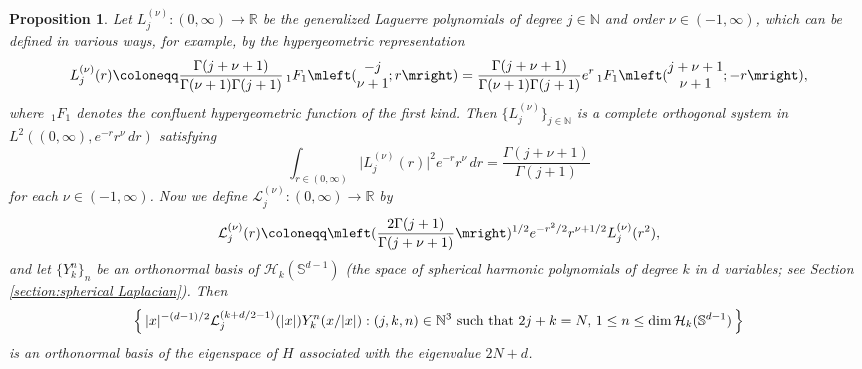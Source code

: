 \documentclass[reqno]{amsart}
\theoremstyle{plain}
\newtheorem{proposition}[theorem]{Proposition}
\numberwithin{equation}{section}
\theoremstyle{remark}
\newcommand{\R}{\mathbb{R}}
\newcommand{\N}{\mathbb{N}}
\renewcommand{\S}{\mathbb{S}}
\newcommand{\intervaloo}[2]{(#1, #2)}
\newcommand{\abs}[1]{\lvert#1\rvert}
\newcommand{\Set}[2]{ \mleft \{ \, #1 : #2 \, \mright\} }
\newcommand{\Hamiltonian}{H}
\newcommand{\hypergeometricpFq}[5]{ \,{}_{#1} F_{#2}\mleft( \begin{matrix}
		#3 \\
		#4
	\end{matrix} ; #5 \mright)  }
\newcommand{\hypergeometricpFqNoArgument}[2]{ \,{}_{#1} F_{#2} }
\newcommand{\LaguerreL}[2]{L_{#1}^{(#2)}}
\newcommand{\LaguerrecalLjnu}[2]{\mathcal{L}_{#1}^{(#2)}}
\newcommand{\Ykn}[2]{Y_{#1}^{#2}}
\newcommand{\HPk}[1]{ \mathcal{H}_{#1} }
\begin{document}
\begin{proposition} \label{prop:Laguerre decomposition}
Let $\LaguerreL{j}{\nu} \colon \intervaloo{0}{\infty} \to \R$ be the generalized Laguerre polynomials of degree $j \in \N$ and order $\nu \in \intervaloo{-1}{\infty}$, which can be defined in various ways, for example, by the hypergeometric representation
\begin{equation} \label{eq:Laguerre polynomials}
	\LaguerreL{j}{\nu}(r) 
	\coloneqq \frac{\Gamma(j+\nu+1)}{\Gamma(\nu+1) \Gamma(j+1)} \hypergeometricpFq{1}{1}{-j}{\nu+1}{r} 
	= \frac{\Gamma(j+\nu+1)}{\Gamma(\nu+1) \Gamma(j+1)} e^{r} \hypergeometricpFq{1}{1}{j+\nu+1}{\nu+1}{-r} ,
\end{equation}
where $\hypergeometricpFqNoArgument{1}{1}$ denotes the confluent hypergeometric function of the first kind.
Then $\{ \LaguerreL{j}{\nu} \}_{j \in \N}$ is a complete orthogonal system in $L^2(\intervaloo{0}{\infty}, e^{-r} r^{\nu} \, dr )$ satisfying
\begin{equation}
 	\int_{r \in \intervaloo{0}{\infty}} \abs{\LaguerreL{j}{\nu}(r)}^2 e^{-r} r^{\nu} \, dr = \frac{\Gamma(j+\nu+1)}{\Gamma(j+1)} 
\end{equation}
for each $\nu \in \intervaloo{-1}{\infty}$.
 	Now we define $\LaguerrecalLjnu{j}{\nu} \colon \intervaloo{0}{\infty} \to \R$ by 
\begin{equation}
\LaguerrecalLjnu{j}{\nu}(r) \coloneqq \mleft( \frac{ 2 \Gamma(j+1) }{ \Gamma(j + \nu + 1) } \mright)^{1/2} e^{-r^2 / 2} r^{\nu + 1/2} \LaguerreL{j}{\nu}(r^2) ,
	\label{eq:Laguerre functions} 
\end{equation}
and let $\{ \Ykn{k}{n} \}_n$ be an orthonormal basis of $\HPk{k}(\S^{d-1})$ (the space of spherical harmonic polynomials of degree $k$ in $d$ variables; see Section \ref{section:spherical Laplacian}).
Then
\begin{equation}
\Set{ \abs{x}^{-(d-1)/2} \LaguerrecalLjnu{j}{k + d/2 - 1}(\abs{x}) \Ykn{k}{n}(x/\abs{x}) }{ (j, k, n) \in \N^3 \text{ such that } 2j + k = N, \, 1 \leq n \leq \dim \HPk{k}(\S^{d-1}) }
\end{equation}
 	is an orthonormal basis of the eigenspace of $\Hamiltonian$ associated with the eigenvalue $2N + d$.
\end{proposition}
\end{document}
